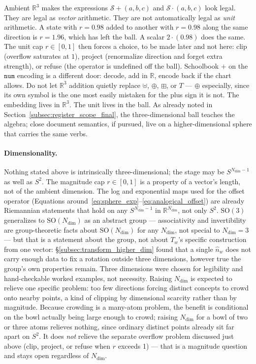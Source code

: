 \documentclass[12pt, a4paper]{article}
\begin{document}
Ambient $\mathbb{R}^3$ makes the expressions
$\mathcal{S}+(a,b,c)$ and $\mathcal{S}\cdot(a,b,c)$ look legal.
They are legal as \emph{vector} arithmetic. They are not automatically
legal as \emph{unit} arithmetic. A state with $r=0.98$ added to
another with $r=0.98$ along the same direction is $r=1.96$, which
has left the ball. A scalar $2\cdot(0.98)$ does the same. The unit
cap $r\in[0,1]$ then forces a choice, to be made later and not
here: clip (overflow saturates at $1$), project (renormalize
direction and forget extra strength), or refuse (the operator is
undefined off the ball). Schoolbook $+$ on the $\mathtt{num}$
encoding is a different door: decode, add in $\mathbb{R}$, encode
back if the chart allows. Do not let $\mathbb{R}^3$ addition
quietly replace $\uplus$, $\oplus$, $\boxplus$, or $T$ --- $\oplus$
especially, since its own symbol is the one most easily mistaken for
the plus sign it is not. The embedding
lives in $\mathbb{R}^3$. The unit lives in the ball.
As already noted in Section~\ref{subsec:register_scope_final},
the three-dimensional ball teaches the algebra; close document
semantics, if pursued, live on a higher-dimensional sphere that
carries the same verbs.

\paragraph{Dimensionality.}
\label{subsec:dimensionality_open}
Nothing stated
above is intrinsically three-dimensional; the stage may be
$S^{N_{\mathrm{dim}}-1}$ as well as $S^2$. The magnitude cap
$r\in[0,1]$ is a property of a vector's length, not of the ambient
dimension. The log and exponential maps used for the offset operator
(Equations around~\eqref{eq:sphere_exp}--\eqref{eq:analogical_offset})
are already Riemannian statements that hold on any $S^{N_{\mathrm{dim}}-1}$ in
$\mathbb{R}^{N_{\mathrm{dim}}}$, not only $S^2$. $\mathrm{SO}(3)$ generalizes to
$\mathrm{SO}(N_{\mathrm{dim}})$ as an abstract group --- associativity and
invertibility are group-theoretic facts about $\mathrm{SO}(N_{\mathrm{dim}})$ for
any $N_{\mathrm{dim}}$, not special to $N_{\mathrm{dim}}=3$ --- but that is a statement about the
group, not about $T_w$'s specific construction from one vector:
\S\ref{subsec:transform_higher_dim} found that a single $\hat n_w$
does not carry enough data to fix a rotation outside three
dimensions, however true the group's own properties remain. Three
dimensions were chosen for legibility and hand-checkable worked
examples, not necessity. Raising $N_{\mathrm{dim}}$ is expected to relieve one
specific problem: too few directions forcing distinct concepts to
crowd onto nearby points, a kind of clipping by dimensional scarcity
rather than by magnitude. Because crowding is a many-atom problem, the
benefit is conditional on the bowl actually being large enough to
crowd; raising $N_{\mathrm{dim}}$ for a bowl of two or three atoms relieves nothing,
since ordinary distinct points already sit far apart on $S^2$. It does
\emph{not} relieve the separate
overflow problem discussed just above (clip, project, or refuse when
$r$ exceeds 1) --- that is a magnitude question and stays open
regardless of $N_{\mathrm{dim}}$.
\end{document}
